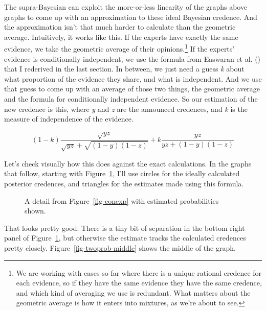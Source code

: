 \documentclass[
  10pt,
  letterpaper,
  DIV=11,
  numbers=noendperiod,
  twoside]{scrartcl}
\begin{document}
The supra-Bayesian can exploit the more-or-less linearity of the graphs
above graphs to come up with an approximation to these ideal Bayesian
credence. And the approximation isn't that much harder to calculate than
the geometric average. Intuitively, it works like this. If the experts
have exactly the same evidence, we take the geometric average of their
opinions.\footnote{We are working with cases so far where there is a
  unique rational credence for each evidence, so if they have the same
  evidence they have the same credence, and which kind of averaging we
  use is redundant. What matters about the geometric average is how it
  enters into mixtures, as we're about to see.} If the experts' evidence
is conditionally independent, we use the formula from Easwaran et al.
() that I rederived in the last
section. In between, we just need a guess \emph{k} about what proportion
of the evidence they share, and what is independent. And we use that
guess to come up with an average of those two things, the geometric
average and the formula for conditionally independent evidence. So our
estimation of the new credence is this, where \emph{y} and \emph{z} are
the announced credences, and \emph{k} is the measure of independence of
the evidence.

\[
(1-k)\frac{\sqrt{yz}}{\sqrt{yz} + \sqrt{(1-y)(1-z)}} + k\frac{yz}{yz + (1-y)(1-z)}
\]

Let's check visually how this does against the exact calculations. In
the graphs that follow, starting with
Figure~\ref{fig-twoprob-bottom-right}, I'll use circles for the ideally
calculated posterior credences, and triangles for the estimates made
using this formula.

\begin{figure}


\caption{\label{fig-twoprob-bottom-right}A detail from
Figure~\ref{fig-conexp} with estimated probabilities shown.}

\end{figure}%

That looks pretty good. There is a tiny bit of separation in the bottom
right panel of Figure~\ref{fig-twoprob-bottom-right}, but otherwise the
estimate tracks the calculated credences pretty closely.
Figure~\ref{fig-twoprob-middle} shows the middle of the graph.
\end{document}
